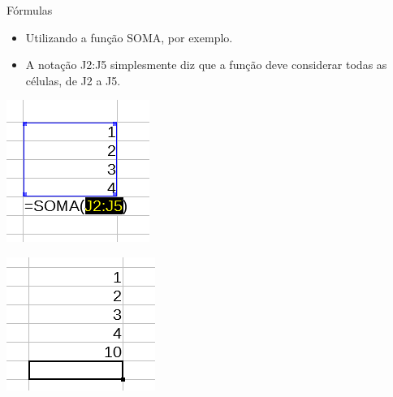 \begin{frame}{Fórmulas}
	\begin{block}{}
		\begin{itemize}
			\item Utilizando a função SOMA, por exemplo.
			\item A notação J2:J5 simplesmente diz que a função deve considerar todas as células, de J2 a J5.
		\end{itemize}
	\end{block}
	
	\begin{minipage}{0.45\linewidth}
		\centering
		\includegraphics[width=1\linewidth]{Figuras/Ch06/fig42}
	\end{minipage}\hfill
	\begin{minipage}{0.45\linewidth}
		\centering
		\includegraphics[width=1\linewidth]{Figuras/Ch06/fig43}
	\end{minipage}
\end{frame}


